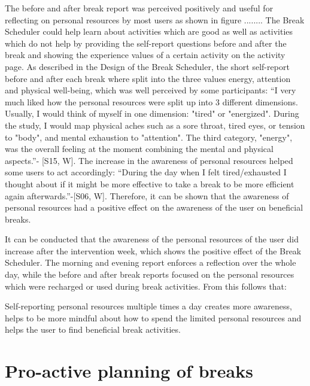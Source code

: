\documentclass{hasel_thesis}
\begin{document}
The before and after break report was perceived positively and useful for reflecting on personal resources by most users as shown in figure ........ The Break Scheduler could help learn about activities which are good as well as activities which do not help by providing the self-report questions before and after the break and showing the experience values of a certain activity on the activity page. As described in the Design of the Break Scheduler, the short self-report before and after each break where split into the three values energy, attention and physical well-being, which was well perceived by some participants: “I very much liked how the personal resources were split up into 3 different dimensions. Usually, I would think of myself in one dimension: "tired" or "energized". During the study, I would map physical aches such as a sore throat, tired eyes, or tension to "body", and mental exhaustion to "attention". The third category, "energy", was the overall feeling at the moment combining the mental and physical aspects.”- [S15, W]. The increase in the awareness of personal resources helped some users to act accordingly: “During the day when I felt tired/exhausted I thought about if it might be more effective to take a break to be more efficient again afterwards.”-[S06, W]. Therefore, it can be shown that the awareness of personal resources had a positive effect on the awareness of the user on beneficial breaks.

It can be conducted that the awareness of the personal resources of the user did increase after the intervention week, which shows the positive effect of the Break Scheduler. The morning and evening report enforces a reflection over the whole day, while the before and after break reports focused on the personal resources which were recharged or used during break activities. From this follows that:

\begin{tcolorbox}[colback=white!5!white,colframe=black!75!black]
  Self-reporting personal resources multiple times a day creates more awareness, helps to be more mindful about how to spend the limited personal resources and helps the user to find beneficial break activities. 
\end{tcolorbox}

\section{Pro-active planning of breaks} \label{planning_breaks}

\end{document}
